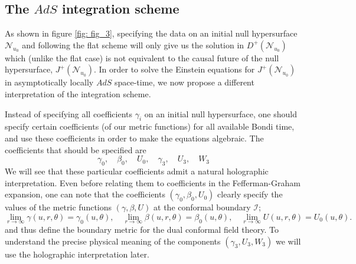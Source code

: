 \documentclass[a4paper,11pt]{article}
\numberwithin{equation}{section}
\begin{document}
\subsection{The $AdS$ integration scheme} \label{subsec: AdS_Scheme}

As shown in figure \ref{fig: fig_3}, specifying the data on an initial null hypersurface $\mathcal{N}_{u_0}$ and following the flat scheme will only give us the solution in $D^+(\mathcal{N}_{u_0})$ which (unlike the flat case) is not equivalent to the causal future of the null hypersurface, $J^+(\mathcal{N}_{u_0})$. In order to solve the Einstein equations for $J^+(\mathcal{N}_{u_0})$ in asymptotically locally $AdS$ space-time, we now propose a different interpretation of the integration scheme. 



Instead of specifying all coefficients $\gamma_i$ on an initial null hypersurface, one should specify certain coefficients (of our metric functions) for all available Bondi time, and use these coefficients in order to make the equations algebraic. The coefficients that should be specified are
\begin{equation}
\gamma_0, \quad  \beta_0, \quad U_0, \quad \gamma_3, \quad U_3, \quad W_3 \tag{4.3}
\end{equation} 
We will see that these particular coefficients admit a natural holographic interpretation. Even before relating them to coefficients in the Fefferman-Graham expansion, one can note that the coefficients $(\gamma_0,  \beta_0, U_0)$ clearly specify the values of the metric functions $(\gamma, \beta, U)$ at the conformal boundary $\mathscr{I}$;
\begin{equation} 
\lim_{r \rightarrow \infty} \gamma(u,r,\theta) = \gamma_0(u, \theta), \quad \lim_{r \rightarrow \infty} \beta(u,r,\theta) = \beta_0(u, \theta), \quad \lim_{r \rightarrow \infty} U(u,r,\theta) = U_0(u, \theta) \tag{4.4}.
\end{equation}
and thus define the boundary metric for the dual conformal field theory.
To understand the precise physical meaning of the components $(\gamma_3, U_3, W_3)$ we will use the holographic interpretation later.
\end{document}
